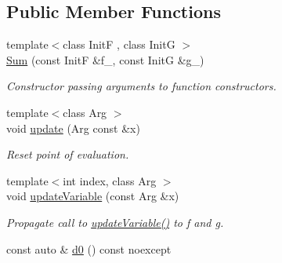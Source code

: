 \subsection*{Public Member Functions}
\begin{DoxyCompactItemize}
\item 
{\footnotesize template$<$class Init\-F , class Init\-G $>$ }\\\hyperlink{structRFFGen_1_1MathematicalOperations_1_1Sum_a8abfebcfef4096f4838fdf49bfbb998a}{Sum} (const Init\-F \&f\-\_\-, const Init\-G \&g\-\_\-)
\begin{DoxyCompactList}\small\item\em Constructor passing arguments to function constructors. \end{DoxyCompactList}\item 
\hypertarget{structRFFGen_1_1MathematicalOperations_1_1Sum_a10c688bb03d5de23728aea547205307b}{{\footnotesize template$<$class Arg $>$ }\\void \hyperlink{structRFFGen_1_1MathematicalOperations_1_1Sum_a10c688bb03d5de23728aea547205307b}{update} (Arg const \&x)}\label{structRFFGen_1_1MathematicalOperations_1_1Sum_a10c688bb03d5de23728aea547205307b}

\begin{DoxyCompactList}\small\item\em Reset point of evaluation. \end{DoxyCompactList}\item 
\hypertarget{structRFFGen_1_1MathematicalOperations_1_1Sum_a6ca0cb2a7c64ee03125f0babcd8ca13a}{{\footnotesize template$<$int index, class Arg $>$ }\\void \hyperlink{structRFFGen_1_1MathematicalOperations_1_1Sum_a6ca0cb2a7c64ee03125f0babcd8ca13a}{update\-Variable} (const Arg \&x)}\label{structRFFGen_1_1MathematicalOperations_1_1Sum_a6ca0cb2a7c64ee03125f0babcd8ca13a}

\begin{DoxyCompactList}\small\item\em Propagate call to \hyperlink{structRFFGen_1_1MathematicalOperations_1_1Sum_a6ca0cb2a7c64ee03125f0babcd8ca13a}{update\-Variable()} to f and g. \end{DoxyCompactList}\item 
\hypertarget{structRFFGen_1_1MathematicalOperations_1_1Sum_ab253acf4c0ee66164c51bf7b3bb6bc85}{const auto \& \hyperlink{structRFFGen_1_1MathematicalOperations_1_1Sum_ab253acf4c0ee66164c51bf7b3bb6bc85}{d0} () const noexcept}\label{structRFFGen_1_1MathematicalOperations_1_1Sum_ab253acf4c0ee66164c51bf7b3bb6bc85}


\end{DoxyCompactItemize}
